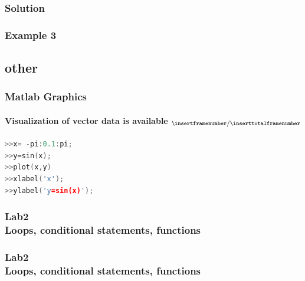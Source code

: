 \documentclass[hyperref={pdfpagelabels=true}]{beamer}
\begin{document}
\subsubsection{Solution}
\begin{frame}
\frametitle{Example 3}
\scriptsize{
\begin{tcolorbox}[title= Code ,width=9.85 cm]

\end{tcolorbox}}
\end{frame}

\subsection{other}
\begin{frame}[fragile]
\frametitle{Matlab Graphics}
\framesubtitle{Visualization of vector data is available $_{\tiny \insertframenumber/\inserttotalframenumber}$}
\begin{lstlisting}[language=C++]
>>x= -pi:0.1:pi; 
>>y=sin(x);
>>plot(x,y)
>>xlabel('x');
>>ylabel('y=sin(x)');
\end{lstlisting}
\begin{tcolorbox}[title= Code ,width=9.85 cm]

\end{tcolorbox}
\end{frame}





\begin{frame}[shrink]
\frametitle{Lab2 \\{\large Loops, conditional statements, functions}}
\small{
\begin{tcolorbox}[title=Conditional statements ,width=9.85 cm]

\end{tcolorbox}

\begin{tcolorbox}[title=loops ,width=9.85 cm]

\end{tcolorbox}
}
\end{frame}

\begin{frame}
\frametitle{Lab2 \\{\large Loops, conditional statements, functions}}
\tiny{
\begin{tcolorbox}[title=saving/loading workspace variables ,width=9.85 cm]

\end{tcolorbox}

\begin{tcolorbox}[title=functions ,width=9.85 cm]

\end{tcolorbox}
}
\end{frame}
\end{document}
